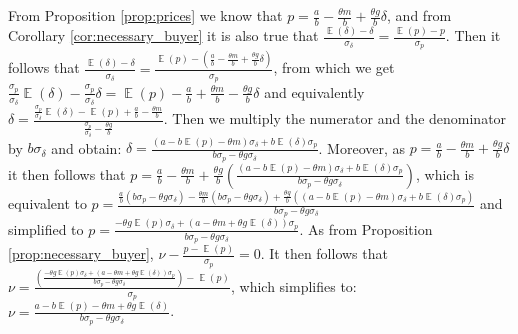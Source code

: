 \documentclass[informs]{informs3}
\begin{document}
From Proposition \ref{prop:prices} we know that $p =\frac{a}{b}-\frac{\theta m}{b}+\frac{\theta g }{b}\delta$, and from  Corollary \ref{cor:necessary_buyer} it is also true that $\frac{\mathop{\mathbb{E}}\left(\delta\right)-\delta}{\sigma_{\delta}}= \frac{\mathop{\mathbb{E}}\left(p\right)-p}{\sigma_{p}}$. Then it follows that $\frac{\mathop{\mathbb{E}}\left(\delta\right)-\delta}{\sigma_{\delta}}=\frac{\mathop{\mathbb{E}}\left(p\right)-(\frac{a}{b}-\frac{\theta m}{b}+\frac{\theta g }{b}\delta)}{\sigma_{p}}$, from which we get 
$\frac{\sigma_{p}}{\sigma_{\delta}}\mathop{\mathbb{E}}\left(\delta\right)-\frac{\sigma_{p}}{\sigma_{\delta}}\delta=\mathop{\mathbb{E}}\left(p\right)-\frac{a}{b}+\frac{\theta m}{b}-\frac{\theta g }{b}\delta$ and equivalently
$\delta=\frac{\frac{\sigma_{p}}{\sigma_{\delta}}\mathop{\mathbb{E}}\left(\delta\right)-\mathop{\mathbb{E}}\left(p\right)+\frac{a}{b}-\frac{\theta m}{b}}{\frac{\sigma_{p}}{\sigma_{\delta}}-\frac{\theta g }{b}}$. Then we multiply the numerator and the denominator by $b\sigma_{\delta}$ and obtain:
$\delta=\frac{\left(a-b\mathop{\mathbb{E}}\left(p\right) -\theta m\right)\sigma_{\delta}+b\mathop{\mathbb{E}}\left(\delta\right)\sigma_{p}}{b\sigma_{p}-\theta g\sigma_{\delta}}$.
Moreover, as $p =\frac{a}{b}-\frac{\theta m}{b}+\frac{\theta g }{b}\delta$ it then follows that $p =\frac{a}{b}-\frac{\theta m}{b}+\frac{\theta g }{b}\left(   \frac{\left(a-b\mathop{\mathbb{E}}\left(p\right) -\theta m\right)\sigma_{\delta}+b\mathop{\mathbb{E}}\left(\delta\right)\sigma_{p}}{b\sigma_{p}-\theta g\sigma_{\delta}}  \right) $, which is equivalent to
$p =\frac{\frac{a}{b}\left(b\sigma_{p}-\theta g\sigma_{\delta}\right)-\frac{\theta m}{b}\left(b\sigma_{p}-\theta g\sigma_{\delta}\right)+\frac{\theta g }{b}\left(   \left(a-b\mathop{\mathbb{E}}\left(p\right) -\theta m\right)\sigma_{\delta}+b\mathop{\mathbb{E}}\left(\delta\right)\sigma_{p}\right)}{b\sigma_{p}-\theta g\sigma_{\delta}}$ and simplified to
$p =\frac{-\theta g \mathop{\mathbb{E}}\left(p\right)\sigma_{\delta}+\left(a-\theta m+\theta g \mathop{\mathbb{E}}\left(\delta\right)\right)\sigma_{p}}{b\sigma_{p}-\theta g\sigma_{\delta}}$.
As from Proposition \ref{prop:necessary_buyer},
$\nu - \frac{p-\mathop{\mathbb{E}}\left(p\right)}{\sigma_{p}}=0$. It then follows that
$\nu = \frac{\left(\frac{-\theta g \mathop{\mathbb{E}}\left(p\right)\sigma_{\delta}+\left(a-\theta m+\theta g \mathop{\mathbb{E}}\left(\delta\right)\right)\sigma_{p}}{b\sigma_{p}-\theta g\sigma_{\delta}} \right)-\mathop{\mathbb{E}}\left(p\right)}{\sigma_{p}}$, which simplifies to:
$\nu =\frac{a-b \mathop{\mathbb{E}}\left(p\right)-\theta m+\theta g \mathop{\mathbb{E}}\left(\delta\right)}{b\sigma_{p}-\theta g\sigma_{\delta}}$.
\end{document}
